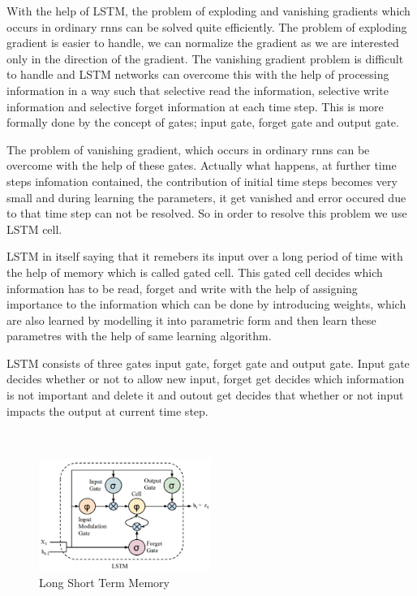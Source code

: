 \documentclass{article}
\begin{document}
{{{{                 With the help of LSTM, the problem of exploding and vanishing gradients which occurs in ordinary rnns can be solved quite efficiently. The problem of exploding gradient is easier to handle, we can normalize the gradient as we are interested only in the direction of the gradient. The vanishing gradient problem is difficult to handle and LSTM networks can overcome this with the help of processing information in a way such that selective read the information, selective write information and selective forget information at each time step. This is more formally done by the concept of gates; input gate, forget gate and output gate.
                 
                 The problem of vanishing gradient, which occurs in ordinary rnns can be overcome with the help of these gates. Actually what happens, at further time steps infomation contained, the contribution of initial time steps becomes very small and during learning the parameters, it get vanished and error occured due to that time step can not be resolved. So in order to resolve this problem we use LSTM cell. 
                 
                 LSTM in itself saying that it remebers its input over a long period of time with the help of memory which is called gated cell. This gated cell decides which information has to be read, forget and write with the help of assigning importance to the information which can be done by introducing weights, which are also learned by modelling it into parametric form and then learn these parametres with the help of same learning algorithm.
                 
                 LSTM consists of three gates input gate, forget gate and output gate. Input gate decides whether or not to allow new input, forget get decides which information is not important and delete it and outout get decides that whether or not input impacts the output at current time step.  
}\\

\begin{figure}[h]

\centering
\includegraphics[width = 0.5\textwidth]{LSTM_Cell.png}
\caption{\label{fig:my-label} Long Short Term Memory}


\end{figure}}}}
\end{document}
